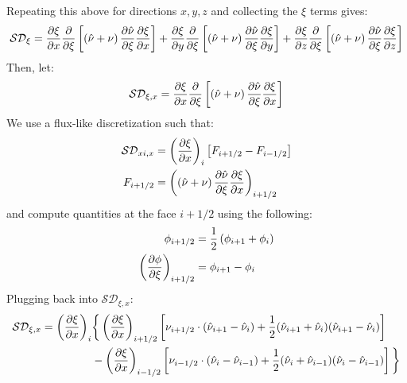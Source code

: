 \documentclass{SelimArticle}
\begin{document}
Repeating this above for directions $x, y, z$ and collecting the $\xi$ terms gives:
$$
    \mathcal{SD}_\xi =
        \frac{\partial \xi}{\partial x}  \frac{\partial }{\partial \xi}  \left[ \left( \hat{\nu} + \nu \right)   \frac{\partial \hat{\nu}}{\partial \xi}  \frac{\partial \xi}{\partial x}   \right]
    +   \frac{\partial \xi}{\partial y}  \frac{\partial }{\partial \xi}  \left[ \left( \hat{\nu} + \nu \right)   \frac{\partial \hat{\nu}}{\partial \xi}  \frac{\partial \xi}{\partial y}   \right]
    +   \frac{\partial \xi}{\partial z}  \frac{\partial }{\partial \xi}  \left[ \left( \hat{\nu} + \nu \right)   \frac{\partial \hat{\nu}}{\partial \xi}  \frac{\partial \xi}{\partial z}   \right]
$$
Then, let:
$$
    \mathcal{SD}_{\xi,x} =
        \frac{\partial \xi}{\partial x}  \frac{\partial }{\partial \xi}  \left[ \left( \hat{\nu} + \nu \right)   \frac{\partial \hat{\nu}}{\partial \xi}  \frac{\partial \xi}{\partial x}   \right]
$$
We use a flux-like discretization such that:
\newcommand{\diffxix}{\ensuremath{ \left( \diff{\xi}{x} \right)}}
\begin{align*}
    \mathcal{SD}_{xi,x} &= \diffxix_i \left[ F_{i+1/2} - F_{i-1/2} \right]\\
    F_{i+1/2} &= \left( \sanu \qdiff{\sa}{\xi}{\xi}{x} \right)_{i+1/2}\\
\end{align*}
and compute quantities at the face $i+1/2$ using the following:
\begin{align*}
    \phi_{i+1/2} &= \frac{1}{2}\left( \phi_{i+1} + \phi_i \right)\\
    \left( \frac{\partial \phi}{\partial \xi} \right)_{i+1/2} &= \phi_{i+1} - \phi_{i}
\end{align*}
Plugging back into $\mathcal{SD}_{\xi,x}$:
\begin{align*}
    \mathcal{SD}_{\xi,x} = \diffxix_i
& \bigg\{
    \left(\diff{\xi}{x}\right)_{i+1/2} \left[
      \nu_{i+1/2}\cdot (\sa_{i+1} - \sa_i) + \frac{1}{2}(\sa_{i+1} + \sa_i)(\sa_{i+1} - \sa_i)
    \right]
    \\
    & - \left(\diff{\xi}{x}\right)_{i-1/2} \left[
      \nu_{i-1/2}\cdot (\sa_{i} - \sa_{i-1}) + \frac{1}{2}(\sa_{i} + \sa_{i-1})(\sa_{i} - \sa_{i-1})
    \right]
\bigg\}
\end{align*}
\end{document}
